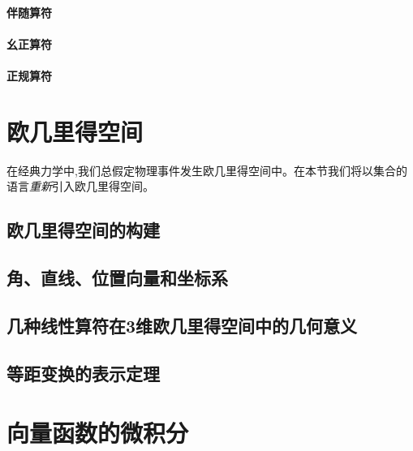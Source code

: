 \documentclass[
  zihao=5,
  a4paper,
  heading=true,
  twoside
]{ctexbook}
\theoremstyle{definition}
\theoremstyle{plain}
\begin{document}
\subsubsection{伴随算符}\label{sec:II.2.4.2_adjoint}

\subsubsection{幺正算符}\label{sec:II.2.4.2_unitary}

\subsubsection{正规算符}\label{sec:II.2.4.2_normal}


\chapter{欧几里得空间}\label{sec:II.3}
在经典力学中,我们总假定物理事件发生欧几里得空间中。在本节我们将以集合的语言\emph{重新}引入欧几里得空间。
\section{欧几里得空间的构建}\label{sec:II.3.1}


\section{角、直线、位置向量和坐标系}\label{sec:II.3.2}


\section{几种线性算符在3维欧几里得空间中的几何意义}\label{sec:II.3.3}


\section{等距变换的表示定理}\label{sec:II.3.4}


\chapter{向量函数的微积分}\label{sec:II.4}
\end{document}
